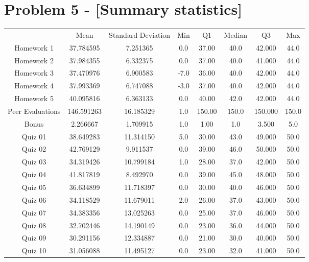 \documentclass[9pt,twoside]{exam}
\begin{document}
\section*{Problem 5 -  [Summary statistics]}
\begin{center}
\begin{tabular}{ c c c c c c c c}
  & Mean & Standard Deviation & Min & Q1 & Median & Q3 & Max  \\ 
 Homework 1 &  37.784595 & 7.251365 &  0.0  & 37.00   &   40.0   &   42.000 &     44.0 \\  
 Homework 2 &  37.984355 & 6.332375 & 0.0   &   37.00 &     40.0 &     41.000  &    44.0 \\  
 Homework 3 &  37.470976 &  6.900583 & -7.0  &    36.00   &   40.0   &   42.000  &    44.0 \\  
 Homework 4 &  37.993369 &  6.747088 &  -3.0   &   37.00   &   40.0   &   42.000  &    44.0 \\  
 Homework 5 &  40.095816 &  6.363133 &0.0   &   40.00   &   42.0  &    42.000     & 44.0 \\  
 Peer Evaluations &  146.591263 & 16.185329 & 1.0  &   150.00  &   150.0   &  150.000 &    150.0 \\  
 Bonus &   2.266667 &  1.709915 &  1.0   &    1.00   &    1.0   &    3.500   &    5.0 \\  
 Quiz 01 &  38.649283 & 11.314150 &  5.0  &    30.00   &   43.0   &   49.000    &  50.0\\  
 Quiz 02 &   42.769129 &  9.911537 & 0.0   &   39.00   &   46.0   &   50.000   &   50.0 \\  
 Quiz 03 &   34.319426 &  10.799184 &  1.0  &    28.00  &    37.0  &    42.000  &    50.0\\  
 Quiz 04 &  41.817819 & 8.492970 &  0.0    &  39.00   &   45.0 &     48.000 &     50.0 \\  
 Quiz 05 &  36.634899 & 11.718397 & 0.0  &    30.00 &     40.0  &    46.000 &     50.0 \\  
 Quiz 06 &  34.118529 & 11.679011 &  2.0  &    26.00  &    37.0   &   43.000  &    50.0 \\  
 Quiz 07 &  34.383356 & 13.025263 & 0.0   &   25.00   &   37.0   &   46.000  &    50.0 \\ 
 Quiz 08 &   32.702446 & 14.190149 & 0.0   &   23.00  &    36.0    &  44.000  &    50.0 \\  
 Quiz 09 &  30.291156 & 12.334887 &  0.0   &   21.00  &    30.0   &   40.000  &    50.0 \\  
 Quiz 10 &  31.056088 & 11.495127 & 0.0  &    23.00 &     32.0  &    41.000 &     50.0 \\  

\end{tabular}
\end{center}
\end{document}
